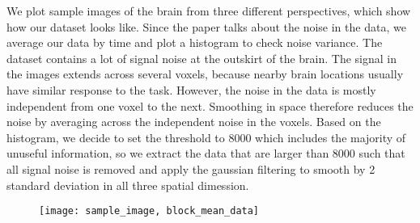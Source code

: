 We plot sample images of the brain from three different perspectives, which 
show how our dataset looks like. Since the paper talks about the noise 
in the data, we average our data by time and plot a histogram to check noise 
variance. The dataset contains a lot of signal noise at the outskirt of the 
brain. The signal in the images extends across several voxels, because nearby 
brain locations usually have similar response to the task. However, the noise 
in the data is mostly independent from one voxel to the next. Smoothing in 
space therefore reduces the noise by averaging across the independent noise in 
the voxels. Based on the histogram, we decide to set the threshold to 8000 which
includes the majority of unuseful information, so we extract the data 
that are larger than 8000 such that all signal noise is removed and apply the 
gaussian filtering to smooth by 2 standard deviation in all three spatial 
dimession.
\begin{figure}
\texttt{[image: sample\_image, block\_mean\_data]}
\end{figure}
